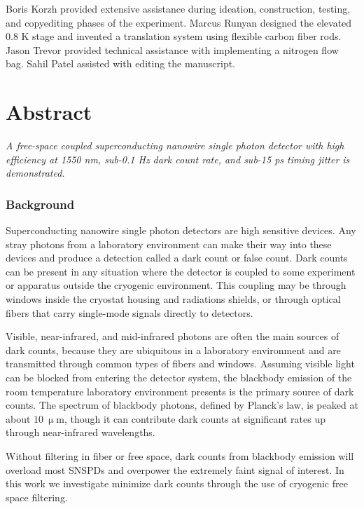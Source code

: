 \documentclass[11pt]{caltech_thesis} %
\begin{document}
Boris Korzh provided extensive assistance during ideation, construction, testing, and copyediting phases of the experiment. Marcus Runyan designed the elevated 0.8 K stage and invented a translation system using flexible carbon fiber rods. Jason Trevor provided technical assistance with implementing a nitrogen flow bag. Sahil Patel assisted with editing the manuscript.

\hypertarget{abstract}{%
\section{Abstract}\label{abstract}}

\emph{A free-space coupled superconducting nanowire single photon detector with high efficiency at 1550 nm, sub-0.1 Hz dark count rate, and sub-15 ps timing jitter is demonstrated.}

\hypertarget{background}{%
\subsubsection{Background}\label{background}}

Superconducting nanowire single photon detectors are high sensitive devices. Any stray photons from a laboratory environment can make their way into these devices and produce a detection called a dark count or false count. Dark counts can be present in any situation where the detector is coupled to some experiment or apparatus outside the cryogenic environment. This coupling may be through windows inside the cryostat housing and radiations shields, or through optical fibers that carry single-mode signals directly to detectors.

Visible, near-infrared, and mid-infrared photons are often the main sources of dark counts, because they are ubiquitous in a laboratory environment and are transmitted through common types of fibers and windows. Assuming visible light can be blocked from entering the detector system, the blackbody emission of the room temperature laboratory environment presents is the primary source of dark counts. The spectrum of blackbody photons, defined by Planck's law, is peaked at about $10~\mathrm{\upmu m}$, though it can contribute dark counts at significant rates up through near-infrared wavelengths.

Without filtering in fiber or free space, dark counts from blackbody emission will overload most SNSPDs and overpower the extremely faint signal of interest. In this work we investigate minimize dark counts through the use of cryogenic free space filtering.
\end{document}
